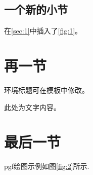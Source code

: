 \documentclass{myrep}
\begin{document}
		\subsection{一个新的小节}
		在\cref{sec:1}中插入了\cref{fig:1}。

	\section{再一节}
		\begin{problem}[一种box示例]
			环境标题可在模板中修改。
		\end{problem}
		
		\begin{notice}[另一种box示例]
			此处为文字内容。
		\end{notice}

	\section{最后一节}
	pgf绘图示例如图\cref{fig:2}所示.
\end{document}
